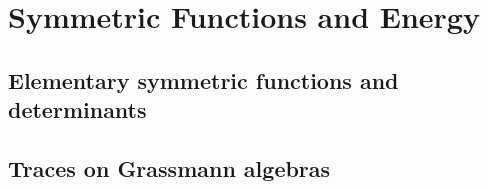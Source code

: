 \chapter{Symmetric Functions and Energy}
\label{ch:4}
\section{Elementary symmetric functions and determinants}
\label{sec:4-1}

\section{Traces on Grassmann algebras}
\label{sec:4-2}

